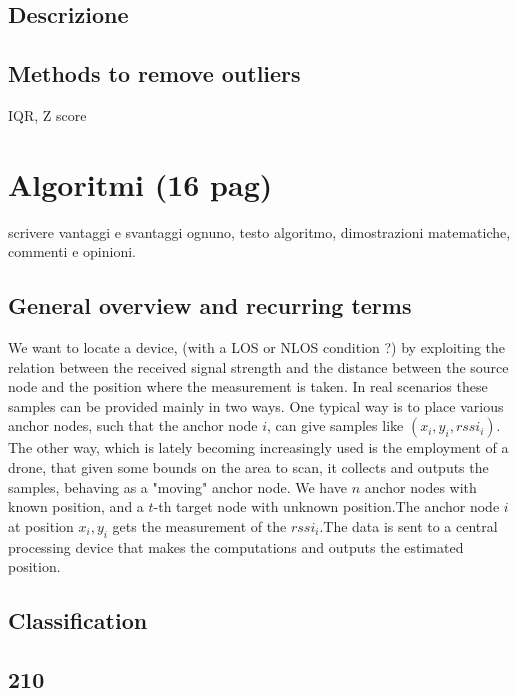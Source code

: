 \documentclass[12pt]{report}
\begin{document}
\section{Descrizione}
\section{Methods to remove outliers}
IQR, Z score

\clearpage



\chapter{Algoritmi (16 pag)}
scrivere vantaggi e svantaggi ognuno, testo algoritmo, dimostrazioni matematiche, commenti e opinioni.
\section{General overview and recurring terms}
We want to locate a device, (with a LOS or NLOS condition ?) by exploiting the relation between the received signal strength and the distance between the source node and the position where the measurement is taken. In real scenarios these samples can be provided mainly in two ways. One typical way is to place various anchor nodes, such that the anchor node $i$, can give samples like $(x_i,y_i,rssi_i)$. The other way, which is lately becoming increasingly used is the employment of a drone, that given some bounds on the area to scan, it collects and outputs the samples, behaving as a "moving" anchor node. We have $n$ anchor nodes with known position, and a $t$-th target node with unknown position.The anchor node $i$ at position $x_i,y_i$ gets the measurement of the $rssi_i$.The data is sent to a central processing device that makes the computations and outputs the estimated position. 
\section{Classification}

\clearpage

\section{210}
\end{document}
